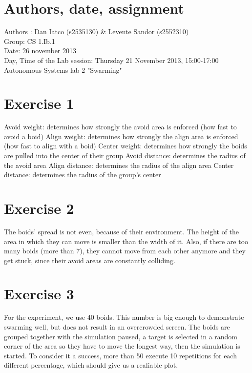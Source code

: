 \documentclass[a4paper,10pt]{article}
\begin{document}
\section*{Authors, date, assignment}
Authors : Dan Iatco (s2535130) \& Levente Sandor (s2552310)\\
Group: CS 1.Ib.1\\
Date:  26 november 2013\\
Day, Time of the Lab session: Thursday 21 November 2013, 15:00-17:00\\
Autonomous Systems lab 2 "Swarming"\\

\section*{Exercise 1}
Avoid weight: determines how strongly the avoid area is enforced (how fast to avoid a boid)
Align weight: determines how strongly the align area is enforced (how fast to align with a boid)
Center weight: determines how strongly the boids are pulled into the center of their group
Avoid distance: determines the radius of the avoid area
Align distance: determines the radius of the align area
Center distance: determines the radius of the group's center

\section*{Exercise 2}
The boids' spread is not even, because of their environment. The height of the area in which they can
move is smaller than the width of it. Also, if there are too many boids (more than 7), they cannot move
from each other anymore and they get stuck, since their avoid areas are constantly colliding.

\section*{Exercise 3}
For the experiment, we use 40 boids. This number is big enough to demonstrate swarming well, but does not
result in an overcrowded screen. The boids are grouped together with the simulation paused, a target is
selected in a random corner of the area so they have to move the longest way, then the simulation is
started. To consider it a success, more than 50%
execute 10 repetitions for each different percentage, which should give us a realiable plot.
\end{document}

